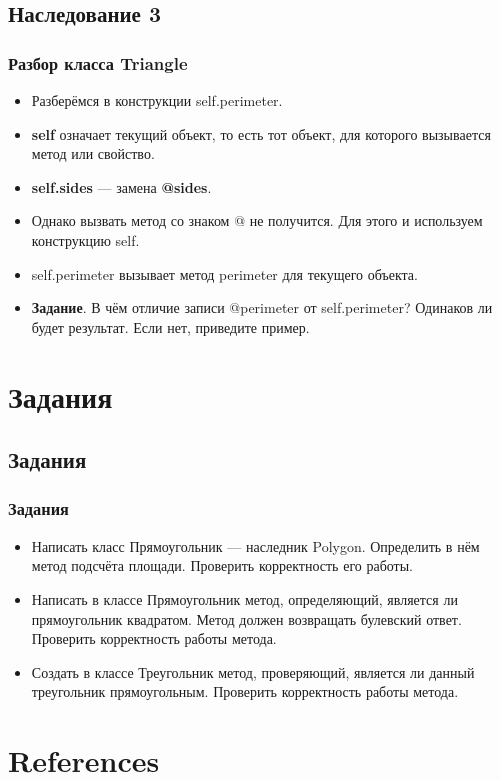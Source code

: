 \documentclass[compress,red]{beamer}
\begin{document}
\subsection{Наследование 3}
\begin{frame}[fragile]
  \frametitle{Разбор класса Triangle}
  \begin{itemize}
    \item Разберёмся в конструкции self.perimeter.
    \item \textbf{self} означает текущий объект, то есть тот объект, для которого вызывается метод или свойство.
    \item \textbf{self.sides} --- замена \textbf{@sides}.
    \item Однако вызвать метод со знаком @ не получится. Для этого и используем конструкцию self.
    \item self.perimeter вызывает метод perimeter для текущего объекта.
    \item \textbf{Задание}. В чём отличие записи @perimeter от self.perimeter? Одинаков ли будет результат. Если нет, приведите пример.
  \end{itemize}
\end{frame}

\section{Задания}
\subsection{Задания}
\begin{frame}[fragile]
  \frametitle{Задания}
  \begin{itemize}
    \item Написать класс Прямоугольник --- наследник Polygon. Определить в нём метод подсчёта площади. Проверить корректность его работы.
    \item Написать в классе Прямоугольник метод, определяющий, является ли прямоугольник квадратом. Метод должен возвращать булевский ответ. Проверить корректность работы метода.
    \item Создать в классе Треугольник метод, проверяющий, является ли данный треугольник прямоугольным. Проверить корректность работы метода.
  \end{itemize}
\end{frame}

\section{References}
\end{document}
